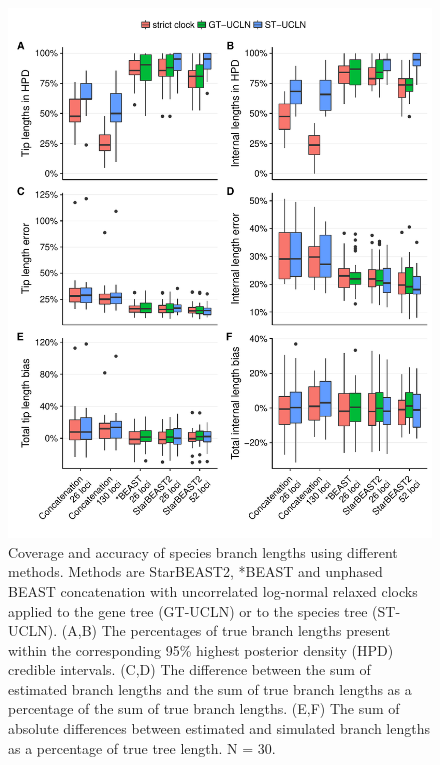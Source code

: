 \documentclass[12pt]{article}
\begin{document}
\begin{figure}[htb!]
\centering
\includegraphics[width=130mm]{branch_length_accuracy_unphased.pdf}
\caption
{Coverage and accuracy of species branch lengths using different methods.
Methods are StarBEAST2, *BEAST and unphased BEAST concatenation with uncorrelated
log-normal relaxed clocks applied to the gene tree (GT-UCLN) or to the species
tree (ST-UCLN). (A,B) The percentages of true branch lengths present within the
corresponding 95\% highest posterior density (HPD) credible intervals. (C,D)
The difference between the sum of estimated branch lengths and the sum of true
branch lengths as a percentage of the sum of true branch lengths. (E,F) The
sum of absolute differences between estimated and simulated branch lengths as
a percentage of true tree length. N = 30.}
\label{fig:branchLengthsError}
\end{figure}

\clearpage
\end{document}
